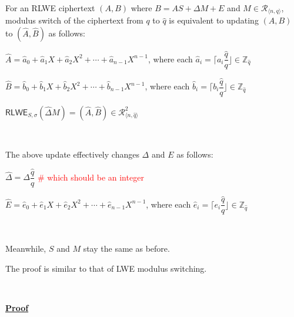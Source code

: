\begin{tcolorbox}[title={\textbf{\tboxlabel{\ref*{subsec:modulus-switch-rlwe}} RLWE Modulus Switching}}]

For an RLWE ciphertext $(A, B)$ where $B = AS + \Delta M + E$ and $M \in \mathcal{R}_{\langle n, q \rangle}$, modulus switch of the ciphertext from $q$ to $\hat q$ is equivalent to updating $(A, B)$ to $(\hat A, \hat B)$ as follows:


$\hat{A} = \hat{a}_0 + \hat{a}_1X + \hat{a}_2X^2 + \cdots + \hat{a}_{n-1}X^{n-1}$, where each $\hat{a}_i = \Big\lceil a_i\dfrac{\hat{q}}{q} \Big\rfloor \in \mathbb{Z}_{\hat{q}}$ 

$\hat{B} = \hat{b}_0 + \hat{b}_1X + \hat{b}_2X^2 + \cdots + \hat{b}_{n-1}X^{n-1}$, where each $\hat{b}_i = \Big\lceil b_i\dfrac{\hat{q}}{q} \Big\rfloor \in \mathbb{Z}_{\hat{q}}$

$\textsf{RLWE}_{{S},\sigma}(\hat{\Delta}  M) = (\hat{A}, \hat{B}) \in \mathcal{R}_{\langle n, \hat{q} \rangle}^{2}$ 

$ $

The above update effectively changes $\Delta$ and $E$ as follows:

$\hat{\Delta} = \Delta\dfrac{\hat{q}}{q}$ \textcolor{red}{\# which should be an integer}

$\hat{E} = \hat{e}_0 + \hat{e}_1X + \hat{e}_2X^2 + \cdots + \hat{e}_{n-1}X^{n-1}$, where each $\hat{e}_i = \Big\lceil e_i\dfrac{\hat{q}}{q} \Big\rfloor \in \mathbb{Z}_{\hat{q}}$

$ $

Meanwhile, $S$ and $M$ stay the same as before.

\end{tcolorbox}

The proof is similar to that of LWE modulus switching.

$ $

\textbf{\underline{Proof}}

